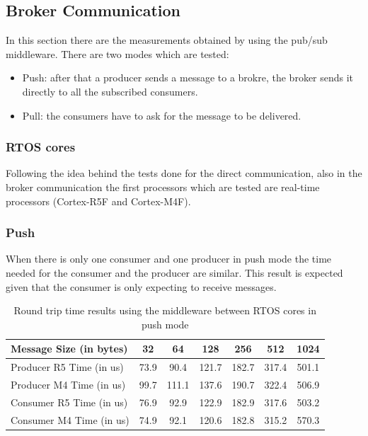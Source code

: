 \subsection{Broker Communication}

In this section there are the measurements obtained by using the pub/sub
middleware. There are two modes which are tested:

\begin{itemize}
    \item   Push: after that a producer sends a message to a brokre, the broker
            sends it directly to all the subscribed consumers.
    \item   Pull: the consumers have to ask for the message to be delivered.
\end{itemize}

\subsubsection{RTOS cores}

Following the idea behind the tests done for the direct communication, also in
the broker communication the first processors which are tested are real-time
processors (Cortex-R5F and Cortex-M4F).

\subsubsection{Push}

When there is only one consumer and one producer in push mode the time needed
for the consumer and the producer are similar.
This result is expected given that the consumer is only expecting to receive
messages.

\begin{table}[H]
\centering
\caption{Round trip time results using the middleware between RTOS cores in
         push mode}
\label{table:broker_communication_RTOS_cores_push}
\begin{tabular}{lcccccc}
\toprule
Message Size (in bytes) & 32 & 64 & 128 & 256 & 512 & 1024 \\
\midrule
Producer R5 Time (in us) & 73.9 & 90.4 & 121.7 & 182.7 & 317.4 & 501.1 \\
Producer M4 Time (in us) & 99.7 & 111.1 & 137.6 & 190.7 & 322.4 & 506.9 \\
Consumer R5 Time (in us) & 76.9 & 92.9 & 122.9 & 182.9 & 317.6 & 503.2 \\
Consumer M4 Time (in us) & 74.9 & 92.1 & 120.6 & 182.8 & 315.2 & 570.3 \\
\bottomrule
\end{tabular}
\end{table}

